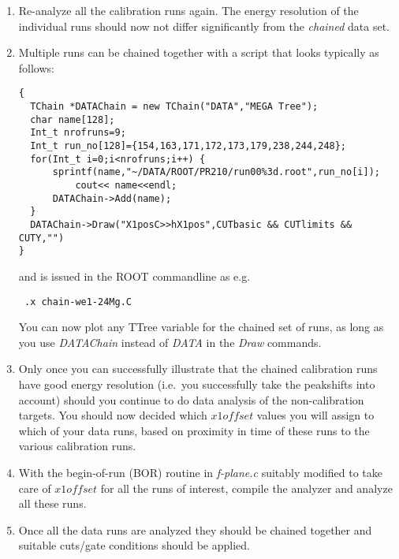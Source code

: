 \documentclass[11pt]{report}
\begin{document}
\begin{enumerate}
\item Re-analyze all the calibration runs again. 
The energy resolution of the individual runs
should now not differ significantly from the {\it chained} data set. 

\item
Multiple runs can be chained together with a script that looks typically as follows:
\begin{verbatim} 
{
  TChain *DATAChain = new TChain("DATA","MEGA Tree");
  char name[128];
  Int_t nrofruns=9;
  Int_t run_no[128]={154,163,171,172,173,179,238,244,248};
  for(Int_t i=0;i<nrofruns;i++)	{
	  sprintf(name,"~/DATA/ROOT/PR210/run00%3d.root",run_no[i]);
          cout<< name<<endl;
	  DATAChain->Add(name);
  }
  DATAChain->Draw("X1posC>>hX1pos",CUTbasic && CUTlimits && CUTY,"")
} 
\end{verbatim}
and is issued in the ROOT commandline as e.g.
\begin{verbatim} .x chain-we1-24Mg.C \end{verbatim}

You can now plot any TTree variable for the chained set of runs, as long as you use
{\it DATAChain} instead of {\it DATA} in the {\it Draw} commands.

\item Only once you can successfully illustrate that the chained calibration runs
have good energy resolution (i.e.~you successfully take the peakshifts into account)
should you continue to do data analysis of the non-calibration targets.
You should now decided which $x1offset$ values you will assign to which
of your data runs, based on proximity in time of these runs to the various
calibration runs.

\item With the begin-of-run (BOR) routine in {\it f-plane.c} suitably modified to take care 
of $x1offset$ for all the runs of interest, compile the analyzer and analyze all these runs.

\item Once all the data runs are analyzed they should be chained together and suitable
cuts/gate conditions should be applied.


\end{enumerate}
\end{document}
